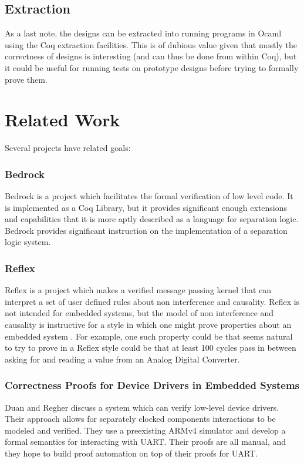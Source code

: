 \documentclass[preprint,12pt]{sigplanconf}
\begin{document}
\subsection{Extraction}
As a last note, the designs can be extracted into running programs in
Ocaml using the Coq extraction facilities. This is of dubious value
given that mostly the correctness of designs is interesting (and can
thus be done from within Coq), but it could be useful for running
tests on prototype designs before trying to formally prove them.

\section{Related Work}
Several projects have related goals:

\subsubsection{Bedrock}
Bedrock is a project which facilitates the formal verification of low
level code. It is implemented as a Coq Library, but it provides
significant enough extensions and capabilities that it is more aptly
described as a language for separation logic. Bedrock provides
significant instruction on the implementation of a separation logic
system\cite{bedrock1}\cite{bedrock2}.
\subsubsection{Reflex}
Reflex is a project which makes a verified message passing kernel that
can interpret a set of user defined rules about non interference and
causality. Reflex is not intended for embedded systems, but the model
of non interference and causality is instructive for a style in which
one might prove properties about an embedded system \cite{reflex}. For
example, one such property could be that seems natural to try to prove
in a Reflex style could be that at least 100 cycles pass in between
asking for and reading a value from an Analog Digital Converter.
\subsubsection{Correctness Proofs for Device Drivers in Embedded Systems}
Duan and Regher\cite{drivers} discuss a system which can verify
low-level device drivers.  Their approach allows for separately
clocked components interactions to be modeled and verified.  They use
a preexisting ARMv4 simulator and develop a formal semantics for
interacting with UART. Their proofs are all manual, and they hope to
build proof automation on top of their proofs for UART.
\end{document}
